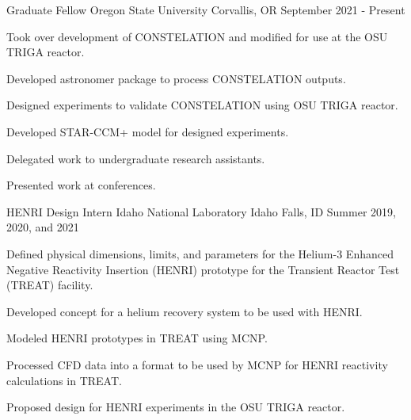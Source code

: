 
\begin{cventries}
  \cventry
    {Graduate Fellow} %
    {Oregon State University} %
    {Corvallis, OR} %
    {September 2021 - Present} %
    {
      \begin{cvitems} %
        \item {Took over development of CONSTELATION and modified for use at the OSU TRIGA reactor.}
        \item{Developed astronomer package to process CONSTELATION outputs.}
        \item{Designed experiments to validate CONSTELATION using OSU TRIGA reactor.}
        \item{Developed STAR-CCM+ model for designed experiments.}
        \item{Delegated work to undergraduate research assistants.}
        \item{Presented work at conferences.}
      \end{cvitems}
    }


  \cventry
    {HENRI Design Intern} %
    {Idaho National Laboratory} %
    {Idaho Falls, ID} %
    {Summer 2019, 2020, and 2021} %
    {
      \begin{cvitems} %
        \item {Defined physical dimensions, limits, and parameters for the Helium-3 Enhanced Negative Reactivity Insertion (HENRI) prototype for the Transient Reactor Test (TREAT) facility.}
        \item{Developed concept for a helium recovery system to be used with HENRI.}
        \item{Modeled HENRI prototypes in TREAT using MCNP.}
        \item{Processed CFD data into a format to be used by MCNP for HENRI reactivity calculations in TREAT.}
        \item{Proposed design for HENRI experiments in the OSU TRIGA reactor.}
      \end{cvitems}
    }


\end{cventries}
